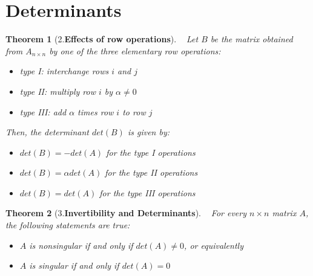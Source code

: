 \documentclass[10.5pt]{article}
\newtheorem{theo}{Theorem}
\newenvironment{definition}[2][Definition]{\begin{trivlist}
\item[\hskip \labelsep {\bfseries #1}\hskip \labelsep {\bfseries #2.}]}{\end{trivlist}}
\newenvironment{lemma}[2][Lemma]{\begin{trivlist}
\item[\hskip \labelsep {\bfseries #1}\hskip \labelsep {\bfseries #2.}]}{\end{trivlist}}
\begin{document}
\section{Determinants}
\begin{theo}[2.\textbf{Effects of row operations}]
~ Let $B$ be the matrix obtained from $A_{n\times n}$ by one of the three elementary row operations:
\begin{itemize}
\item type I: interchange rows $i$ and $j$
\item type II: multiply row $i$ by $\alpha \neq 0$
\item type III: add $\alpha $ times row $i$ to row $j$
\end{itemize}
Then, the determinant $det(B)$ is given by:
\begin{itemize}
\item $det(B)=-det(A)$ for the type I operations
\item $det(B)=\alpha det(A)$ for the type II operations
\item $det(B)=det(A)$ for the type III operations
\end{itemize}
\end{theo}
\begin{theo}[3.\textbf{Invertibility and Determinants}]
~ For every $n\times n$ matrix $A$, the following statements are true:
\begin{itemize}
\item $A$ is nonsingular if and only if $det(A)\neq 0$, or equivalently
\item $A$ is singular if and only if $det(A)=0$
\end{itemize}
\end{theo}
\end{document}
